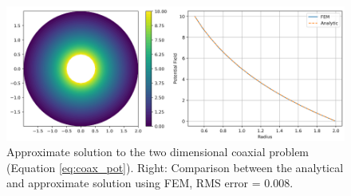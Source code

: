 \documentclass{PoS}
\begin{document}
\begin{figure}[hbt]
    \centering
    \includegraphics[width = 0.80\linewidth]{Figures/FEM/Pot_and Comparisson.png}
    \caption{Approximate solution to the two dimensional coaxial problem (Equation \ref{eq:coax_pot}). Right: Comparison between the analytical and approximate solution using FEM, RMS error = 0.008.}
    \label{fig:VE_Fem}
\end{figure}
\end{document}
